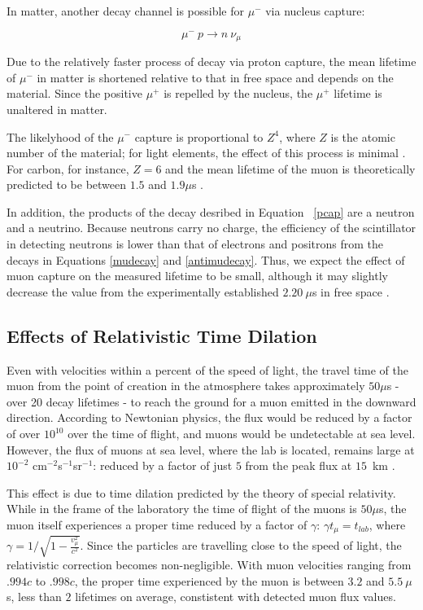 In matter, another decay channel is possible for $\mu^-$ via nucleus
capture:

\begin{equation}\mu^-~p \rightarrow n~\nu_{\mu} \label{pcap} \end{equation}

Due to the relatively faster process of decay via proton capture, the
mean lifetime of $\mu^-$ in matter is shortened relative to that in
free space and depends on the material. Since the positive $\mu^+$ is
repelled by the nucleus, the $\mu^+$ lifetime is unaltered in matter.

The likelyhood of the $\mu^-$ capture is proportional to $Z^4$, where
$Z$ is the atomic number of the material; for light elements, the
effect of this process is minimal \cite[p.172]{rossi}. For carbon, for
instance, $Z=6$ and the mean lifetime of the muon is theoretically
predicted to be between $1.5$ and $1.9\mu$s \cite[p.~170]{rossi}.

In addition, the products of the decay desribed in Equation
~\eqref{pcap} are a neutron and a neutrino. Because neutrons carry no
charge, the
efficiency of the scintillator in detecting neutrons is lower than that of
electrons and positrons from the decays in Equations
\eqref{mudecay} and \eqref{antimudecay}.  Thus, we expect the effect of muon capture on the measured
lifetime to be small, although it may slightly decrease the value from
the experimentally established $2.20~\mu$s in free space \cite{pdg}.

\subsection{Effects of Relativistic Time Dilation}

Even with velocities within a percent of the speed of light, the
travel time of the muon from the point of creation in the atmosphere
takes approximately $50\mu$s - over 20 decay lifetimes - to reach the
ground for a muon emitted in the downward direction. According to
Newtonian physics, the flux would be reduced by a factor of over
$10^{10}$ over the time of flight, and muons would be undetectable at
sea level. However, the flux of muons at sea level, where the lab is
located, remains large at $10^{-2}$ cm$^{-2}$s$^{-1}$sr$^{-1}$:
reduced by a factor of just $5$ from the peak flux at $15$~km
\cite{rossi}.

This effect is due to time dilation predicted by the theory of special
relativity. While in the frame of the laboratory the time of flight of
the muons is $50\mu$s, the muon itself experiences a proper time
reduced by a factor of $\gamma$: $ \gamma t_{\mu} = t_{lab}$, where
$\gamma = 1/\sqrt{1 - \frac{v_{\mu}^2}{c^2}}$. Since the particles are
travelling close to the speed of light, the relativistic correction
becomes non-negligible. With muon velocities ranging from $.994c$ to
$.998c$, the proper time experienced by the muon is between $3.2$ and
$5.5~\mu$s, less than $2$ lifetimes on average, constistent with
detected muon flux values.

